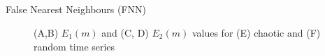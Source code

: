 \subsection{}
{

\begin{frame}{False Nearest Neighbours (FNN)}
    \begin{figure}
        \centering
	\caption{(A,B) $E_1(m)$ and (C, D) $E_2(m)$ values for (E) chaotic 
		and (F) random time series} 
   \end{figure}
	
\end{frame}
}


